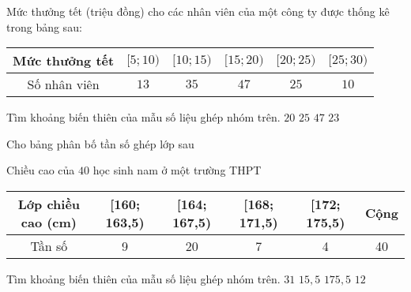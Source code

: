 \begin{ex}
	Mức thưởng tết (triệu đồng) cho các nhân viên của một công ty được thống kê trong bảng sau:
	\vspace*{-10pt}
	\begin{center}
		\begin{tabular}{|c|c|c|c|c|c|}
			\hline Mức thưởng tết & {$[5 ; 10)$} & {$[10 ; 15)$} & {$[15 ; 20)$} & {$[20 ; 25)$} &  {$[25 ;30)$} \\
			\hline Số nhân viên & $13$ & $35$ & $47$ & $25$ & $10$  \\
			\hline
		\end{tabular}
	\end{center}
	Tìm khoảng biến thiên của mẫu số liệu ghép nhóm trên.
	\choice
	{$20$}
	{\True $25$}
	{$47$}
	{$23$}
\end{ex}
\begin{ex}
	Cho bảng phân bố tần số ghép lớp sau
	\vspace*{-10pt}
	\begin{center}
		Chiều cao của $40$ học sinh nam ở một trường THPT\\
		\begin{tabular}{|c|c|c|c|c|c|}
			\hline
			Lớp chiều cao (cm) & [160; 163,5) & [164; 167,5) & [168; 171,5) & [172; 175,5) & Cộng\\
			\hline
			Tần số & 9 & 20 & 7 & 4 & 40\\
			\hline
		\end{tabular}
	\end{center}
	Tìm khoảng biến thiên của mẫu số liệu ghép nhóm trên.
	\choice
	{$31$}
	{\True $15,5$}
	{$175,5$}
	{$12$}
\end{ex}

